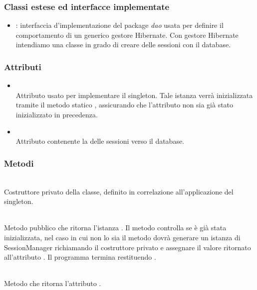 \subsubsection*{Classi estese ed interfacce implementate}

\begin{itemize}
	\item {}: interfaccia d'implementazione del package \textit{dao} usata per definire il comportamento di un generico gestore Hibernate. Con gestore Hibernate intendiamo una classe in grado di creare delle sessioni con il database.
\end{itemize}

\subsubsection*{Attributi}

\begin{itemize}
	\item{}\\
	Attributo usato per implementare il  singleton. Tale istanza verrà inizializzata tramite il metodo statico , assicurando che l'attributo non sia già stato inizializzato in precedenza.
	\item{}\\
	Attributo contenente la  delle sessioni verso il database.
\end{itemize}

\subsubsection*{Metodi}

\begin{description}
	\item{}\\
	Costruttore privato della classe, definito  in correlazione all'applicazione del  singleton.
	\item{}\\
	Metodo pubblico che ritorna l'istanza . Il metodo controlla se  è già stata inizializzata, nel caso in cui non lo sia il metodo dovrà generare un istanza di SessionManager richiamando il costruttore privato  e assegnare il valore ritornato all'attributo . Il programma termina restituendo .
	\item{}\\
	Metodo che ritorna l'attributo .
\end{description}


